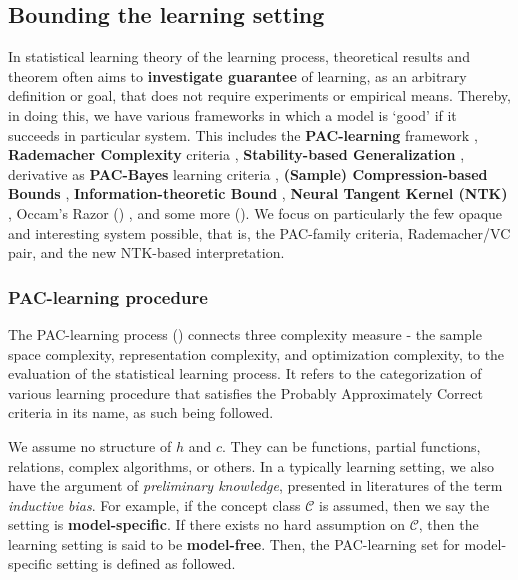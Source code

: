 \documentclass[10pt]{article}
\begin{document}
\subsection{Bounding the learning setting}

In statistical learning theory of the learning process, theoretical results and theorem often aims to \textbf{investigate guarantee} of learning, as an arbitrary definition or goal, that does not require experiments or empirical means. Thereby, in doing this, we have various frameworks in which a model is `good' if it succeeds in particular system. This includes the \textbf{PAC-learning} framework \cite{10.1145/1968.1972,VapnikChervonenkis:1971}, \textbf{Rademacher Complexity} criteria \cite{BartlettMendelson:2002:Rademacher,BartlettBousquetMendelson:2005:LocalRademacher}, \textbf{Stability-based Generalization} \cite{BousquetElisseeff:2002:Stability}, derivative as \textbf{PAC-Bayes} learning criteria \cite{McAllester:1999:PACBayes}, \textbf{(Sample) Compression-based Bounds} \cite{FloydWarmuth:1995:SampleCompression}, \textbf{Information-theoretic Bound} \cite{RussoZou:2016:InformationTheory,XuRaginsky:2017:InfoGen}, \textbf{Neural Tangent Kernel (NTK)} \cite{Jacot:2018:NTK}, Occam's Razor (\cite{10.5555/200548}) , and some more (\cite{Bartlett:1998:MarginComplexity,XuMannor:2010:RobustnessGeneralization,LittlestoneWarmuth:1994:WeightedMajority}). We focus on particularly the few opaque and interesting system possible, that is, the PAC-family criteria, Rademacher/VC pair, and the new NTK-based interpretation.

\subsubsection{PAC-learning procedure}

The PAC-learning process (\cite{10.5555/2621980,10.5555/2371238,STL_Hajek_Maxim_2021}) connects three complexity measure - the sample space complexity, representation complexity, and optimization complexity, to the evaluation of the statistical learning process. It refers to the categorization of various learning procedure that satisfies the Probably Approximately Correct criteria in its name, as such being followed. 

We assume no structure of $h$ and $c$. They can be functions, partial functions, relations, complex algorithms, or others. In a typically learning setting, we also have the argument of \textit{preliminary knowledge}, presented in literatures of the term \textit{inductive bias}. For example, if the concept class $\mathcal{C}$ is assumed, then we say the setting is \textbf{model-specific}. If there exists no hard assumption on $\mathcal{C}$, then the learning setting is said to be \textbf{model-free}. Then, the PAC-learning set for model-specific setting is defined as followed. 
\end{document}
